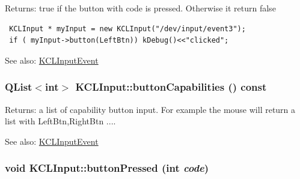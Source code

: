 \begin{Desc}
\item[Returns:]true if the button with code is pressed. Otherwise it return false 

\begin{Code}\begin{verbatim} KCLInput * myInput = new KCLInput("/dev/input/event3");
 if ( myInput->button(LeftBtn)) kDebug()<<"clicked";
\end{verbatim}
\end{Code}

 \end{Desc}
\begin{Desc}
\item[See also:]\hyperlink{class_k_c_l_input_event}{KCLInputEvent} \end{Desc}
\hypertarget{class_k_c_l_input_34ef86b5dca6991de90743a5c20d8c38}{
\subsubsection[{buttonCapabilities}]{\setlength{\rightskip}{0pt plus 5cm}QList$<$int$>$ KCLInput::buttonCapabilities () const}}
\label{class_k_c_l_input_34ef86b5dca6991de90743a5c20d8c38}


\begin{Desc}
\item[Returns:]a list of capability button input. For example the mouse will return a list with LeftBtn,RightBtn .... \end{Desc}
\begin{Desc}
\item[See also:]\hyperlink{class_k_c_l_input_event}{KCLInputEvent} \end{Desc}
\hypertarget{class_k_c_l_input_b82e826fcc0f790ff153c5e4ac074344}{
\subsubsection[{buttonPressed}]{\setlength{\rightskip}{0pt plus 5cm}void KCLInput::buttonPressed (int {\em code})}}
\label{class_k_c_l_input_b82e826fcc0f790ff153c5e4ac074344}


